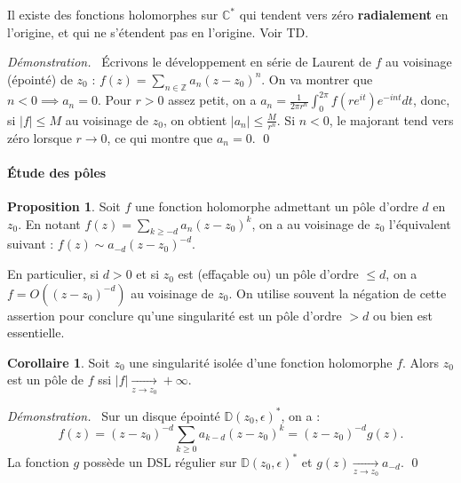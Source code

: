 \documentclass[11pt,a4paper]{article}
\newcommand{\Z}{\mathbb{Z}}
\newcommand{\D}{\mathbb{D}}
\newcommand{\C}{\mathbb{C}}
\newcommand{\cvgto}[1]{\xrightarrow[#1]{}}
\theoremstyle{definition}
\newtheorem{proposition}[theoreme]{Proposition}
\newtheorem{corollaire}[theoreme]{Corollaire}
\renewenvironment{proof}{\color{preuve}\emph{Démonstration.~}}{\qed\vspace{1em}}
\theoremstyle{plain}
\begin{document}
\begin{remarque}
Il existe des fonctions holomorphes sur $\C^*$ qui tendent vers zéro \textbf{radialement} en l'origine, et qui ne s'étendent pas en l'origine.
 Voir TD.
\end{remarque}

\begin{proof}
Écrivons le développement en série de Laurent de $f$ au voisinage (épointé) de $z_0$ : $f(z) = \sum_{n\in\Z} a_n(z-z_0)^n$. On va montrer que $n<0\implies a_n=0$.
Pour $r>0$ assez petit, on a $a_n = \frac{1}{2\pi r^n} \int_0^{2\pi} f(re^{it}) e^{-int} dt$, donc, si $|f|\leq M$ au voisinage de $z_0$, on obtient 
$|a_n| \leq \frac{M}{r^n}$.
Si $n<0$, le majorant tend vers zéro lorsque $r\to 0$, ce qui montre que $a_n=0$.
\end{proof}


\paragraph{Étude des pôles}


\begin{proposition}
Soit $f$ une fonction holomorphe admettant un pôle d'ordre $d$ en $z_0$.
En notant $f(z) = \sum_{k\geq -d} a_n (z-z_0)^{k}$, on a au voisinage de $z_0$ l'équivalent suivant : $f(z) \sim a_{-d}(z-z_0)^{-d}$.
\end{proposition}



\begin{remarque}
En particulier, si $d>0$ et si  $z_0$ est (effaçable ou) un pôle d'ordre $\leq d$, on a $f = O((z-z_0)^{-d})$ au voisinage de $z_0$.
On utilise souvent la négation de cette assertion pour conclure qu'une singularité est un pôle d'ordre $>d$ ou bien est essentielle.
\end{remarque}


\begin{corollaire}
Soit $z_0$ une singularité isolée d'une fonction holomorphe $f$.
Alors $z_0$ est un pôle de $f$ ssi $|f|\cvgto{z\to z_0} +\infty$.
\end{corollaire}



\begin{proof}
Sur un disque épointé $\D(z_0,\epsilon)^*$, on a : 
\[
f(z) = (z-z_0)^{-d} \sum_{k\geq 0} a_{k-d} (z-z_0)^k = (z-z_0)^{-d} g(z).
\]
La fonction $g$ possède un DSL régulier sur $\D(z_0,\epsilon)^*$ et $g(z)\cvgto{z\to z_0} a_{-d}$.
\end{proof}
\end{document}
